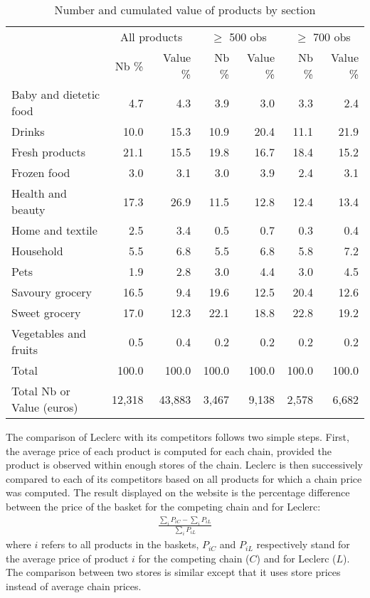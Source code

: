 \documentclass[english]{article}
\begin{document}
\begin{table}[htbp]
\caption{Number and cumulated value of products by section}
\label{tab:qlmc_sections}
\begin{tabular}{lrr|rr|rr}
\toprule
\toprule
& \multicolumn{2}{c|}{All products} & \multicolumn{2}{c|}{$\ge$ 500 obs} & \multicolumn{2}{c}{$\ge$ 700 obs} \\
& Nb \% & Value \% & Nb \% & Value \% & Nb \% & Value \% \\
\midrule
    Baby and dietetic food & 4.7   & 4.3   & 3.9   & 3.0   & 3.3   & 2.4 \\
    Drinks & 10.0  & 15.3  & 10.9  & 20.4  & 11.1  & 21.9 \\
    Fresh products & 21.1  & 15.5  & 19.8  & 16.7  & 18.4  & 15.2 \\
    Frozen food & 3.0   & 3.1   & 3.0   & 3.9   & 2.4   & 3.1 \\
    Health and beauty & 17.3  & 26.9  & 11.5  & 12.8  & 12.4  & 13.4 \\
    Home and textile & 2.5   & 3.4   & 0.5   & 0.7   & 0.3   & 0.4 \\
    Household & 5.5   & 6.8   & 5.5   & 6.8   & 5.8   & 7.2 \\
    Pets  & 1.9   & 2.8   & 3.0   & 4.4   & 3.0   & 4.5 \\
    Savoury grocery & 16.5  & 9.4   & 19.6  & 12.5  & 20.4  & 12.6 \\
    Sweet grocery & 17.0  & 12.3  & 22.1  & 18.8  & 22.8  & 19.2 \\
    Vegetables and fruits & 0.5   & 0.4   & 0.2   & 0.2   & 0.2   & 0.2 \\
\midrule
    Total & 100.0 & 100.0 & 100.0 & 100.0 & 100.0 & 100.0 \\
    Total Nb or Value (euros) & 12,318 & 43,883 & 3,467 & 9,138 & 2,578 & 6,682 \\
\bottomrule
\bottomrule
\end{tabular}
\end{table}

The comparison of Leclerc with its competitors follows two simple steps. First, the average price of each product is computed for each chain, provided the product is observed within enough stores of the chain. Leclerc is then successively compared to each of its competitors based on all products for which a chain price was computed. The result displayed on the website is the percentage difference between the price of the basket for the competing chain and for Leclerc:
\begin{align*}
\frac{\sum\limits_{i} P_{iC} - \sum\limits_{i} P_{iL}}{\sum\limits_{i} P_{iL}}
\end{align*}
where $i$ refers to all products in the baskets, $P_{iC}$ and $P_{iL}$ respectively stand for the average price of product $i$ for the competing chain ($C$) and for Leclerc ($L$). The comparison between two stores is similar except that it uses store prices instead of average chain prices.
\end{document}
